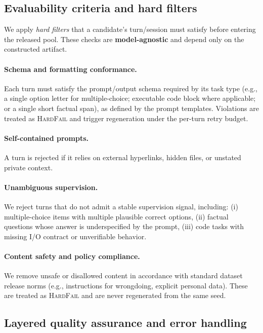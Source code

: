 \subsection{Evaluability criteria and hard filters}
\label{app:data_quality_evaluability}

We apply \emph{hard filters} that a candidate's turn/session must satisfy before entering the released pool.
These checks are \textbf{model-agnostic} and depend only on the constructed artifact.

\paragraph{Schema and formatting conformance.}
Each turn must satisfy the prompt/output schema required by its task type (e.g., a single option letter for multiple-choice; executable code block where applicable; or a single short factual span), as defined by the prompt templates. Violations are treated as \textsc{HardFail} and trigger regeneration under the per-turn retry budget.

\paragraph{Self-contained prompts.}
A turn is rejected if it relies on external hyperlinks, hidden files, or unstated private context.

\paragraph{Unambiguous supervision.}
We reject turns that do not admit a stable supervision signal, including:
(i) multiple-choice items with multiple plausible correct options,
(ii) factual questions whose answer is underspecified by the prompt,
(iii) code tasks with missing I/O contract or unverifiable behavior.

\paragraph{Content safety and policy compliance.}
We remove unsafe or disallowed content in accordance with standard dataset release norms (e.g., instructions for wrongdoing, explicit personal data).
These are treated as \textsc{HardFail} and are never regenerated from the same seed.

\subsection{Layered quality assurance and error handling}
\label{app:data_quality_layered}


